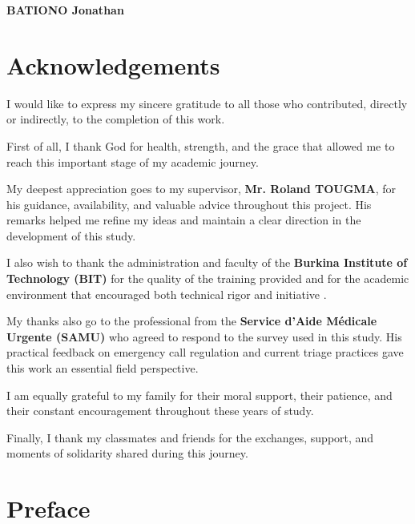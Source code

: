 \documentclass[a4paper,12pt,oneside]{report}
\begin{document}
\textbf{BATIONO Jonathan}
\clearpage

\section*{Acknowledgements}
\vspace{0.5cm}
\justifying

I would like to express my sincere gratitude to all those who contributed, directly or indirectly, to the completion of this work.

First of all, I thank God for health, strength, and the grace that allowed me to reach this important stage of my academic journey.

My deepest appreciation goes to my supervisor, \textbf{Mr. Roland TOUGMA}, for his guidance, availability, and valuable advice throughout this project. His remarks helped me refine my ideas and maintain a clear direction in the development of this study.

I also wish to thank the administration and faculty of the \textbf{Burkina Institute of Technology (BIT)} for the quality of the training provided and for the academic environment that encouraged both technical rigor and initiative \cite{bitsite}.

My thanks also go to the professional from the \textbf{Service d'Aide M\'edicale Urgente (SAMU)} who agreed to respond to the survey used in this study. His practical feedback on emergency call regulation and current triage practices gave this work an essential field perspective.

I am equally grateful to my family for their moral support, their patience, and their constant encouragement throughout these years of study.

Finally, I thank my classmates and friends for the exchanges, support, and moments of solidarity shared during this journey.

\clearpage

\section*{Preface}
\justifying
\end{document}
